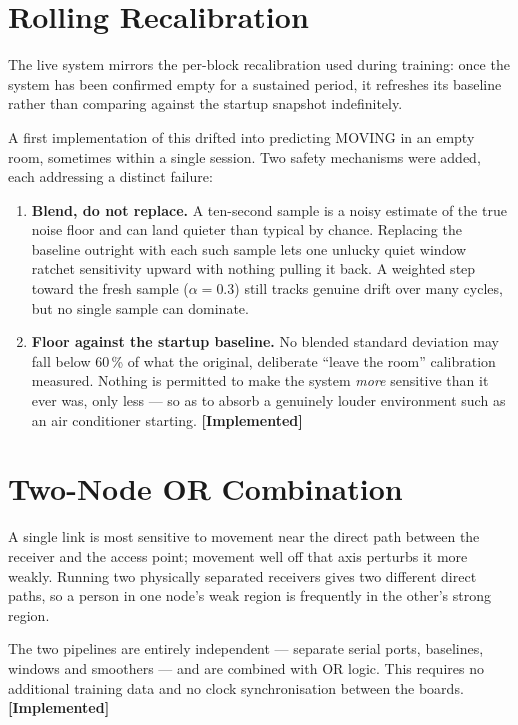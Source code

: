 \documentclass[11pt,a4paper,oneside]{report}
\newcommand{\evidencetag}[2]{{\small\sffamily\bfseries\textcolor{#1}{[#2]}}}
\newcommand{\Impl}{\evidencetag{good}{Implemented}}
\begin{document}
\section{Rolling Recalibration}

The live system mirrors the per-block recalibration used during training: once
the system has been confirmed empty for a sustained period, it refreshes its
baseline rather than comparing against the startup snapshot indefinitely.

A first implementation of this drifted into predicting MOVING in an empty room,
sometimes within a single session. Two safety mechanisms were added, each
addressing a distinct failure:

\begin{enumerate}[leftmargin=1.6em, itemsep=3pt]
  \item \textbf{Blend, do not replace.} A ten-second sample is a noisy estimate
        of the true noise floor and can land quieter than typical by chance.
        Replacing the baseline outright with each such sample lets one unlucky
        quiet window ratchet sensitivity upward with nothing pulling it back. A
        weighted step toward the fresh sample ($\alpha = 0.3$) still tracks
        genuine drift over many cycles, but no single sample can dominate.
  \item \textbf{Floor against the startup baseline.} No blended standard
        deviation may fall below 60\,\% of what the original, deliberate
        ``leave the room'' calibration measured. Nothing is permitted to make
        the system \emph{more} sensitive than it ever was, only less --- so as
        to absorb a genuinely louder environment such as an air conditioner
        starting. \Impl
\end{enumerate}

\section{Two-Node OR Combination}

A single link is most sensitive to movement near the direct path between the
receiver and the access point; movement well off that axis perturbs it more
weakly. Running two physically separated receivers gives two different direct
paths, so a person in one node's weak region is frequently in the other's
strong region.

The two pipelines are entirely independent --- separate serial ports,
baselines, windows and smoothers --- and are combined with OR logic. This
requires no additional training data and no clock synchronisation between the
boards. \Impl
\end{document}
